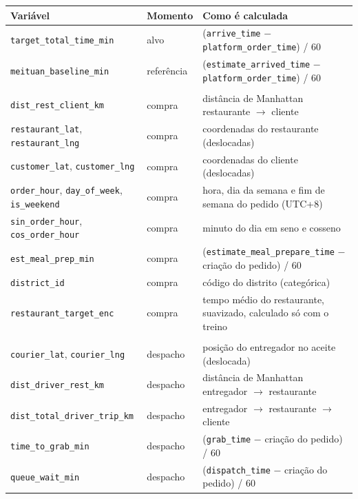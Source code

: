 \documentclass[11pt,a4paper]{article}
\begin{document}
\begin{table}[H]
\centering\scriptsize
\begin{tabularx}{\linewidth}{>{\raggedright\arraybackslash}p{5.6cm} l L}
\toprule
Variável & Momento & Como é calculada \\
\midrule
\texttt{target\_total\_time\_min} & alvo & (\texttt{arrive\_time} $-$ \texttt{platform\_order\_time}) / 60 \\
\texttt{meituan\_baseline\_min} & referência & (\texttt{estimate\_arrived\_time} $-$ \texttt{platform\_order\_time}) / 60 \\
\midrule
{} \\
\texttt{dist\_rest\_client\_km} & compra & distância de Manhattan restaurante $\rightarrow$ cliente \\
\texttt{restaurant\_lat}, \texttt{restaurant\_lng} & compra & coordenadas do restaurante (deslocadas) \\
\texttt{customer\_lat}, \texttt{customer\_lng} & compra & coordenadas do cliente (deslocadas) \\
\texttt{order\_hour}, \texttt{day\_of\_week}, \texttt{is\_weekend} & compra & hora, dia da semana e fim de semana do pedido (UTC+8) \\
\texttt{sin\_order\_hour}, \texttt{cos\_order\_hour} & compra & minuto do dia em seno e cosseno \\
\texttt{est\_meal\_prep\_min} & compra & (\texttt{estimate\_meal\_prepare\_time} $-$ criação do pedido) / 60 \\
\texttt{district\_id} & compra & código do distrito (categórica) \\
\texttt{restaurant\_target\_enc} & compra & tempo médio do restaurante, suavizado, calculado só com o treino \\
\midrule
{} \\
\texttt{courier\_lat}, \texttt{courier\_lng} & despacho & posição do entregador no aceite (deslocada) \\
\texttt{dist\_driver\_rest\_km} & despacho & distância de Manhattan entregador $\rightarrow$ restaurante \\
\texttt{dist\_total\_driver\_trip\_km} & despacho & entregador $\rightarrow$ restaurante $\rightarrow$ cliente \\
\texttt{time\_to\_grab\_min} & despacho & (\texttt{grab\_time} $-$ criação do pedido) / 60 \\
\texttt{queue\_wait\_min} & despacho & (\texttt{dispatch\_time} $-$ criação do pedido) / 60 \\

\end{tabularx}
\end{table}
\end{document}
